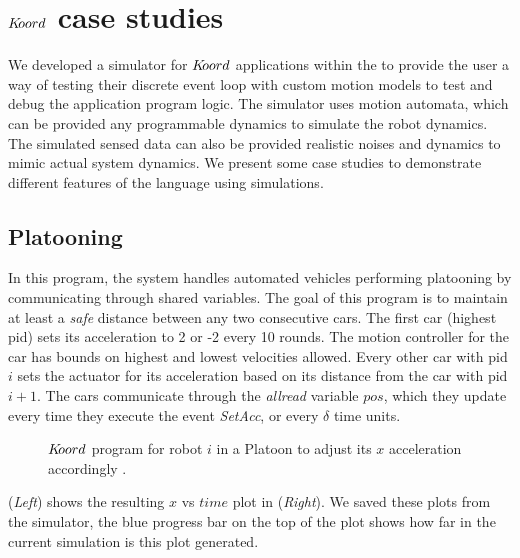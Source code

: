 \section{$K\kern-2pt oord$ case studies}

We developed a simulator for $K\kern-2pt oord$ applications within the to provide the user a way of testing their discrete event loop with custom motion models to test and debug the application program logic. The  simulator uses motion automata, which can be provided any programmable dynamics to simulate the robot dynamics. The simulated sensed data can also be provided realistic noises and dynamics to mimic actual system dynamics. We present some case studies to demonstrate different features of the language using simulations.
\subsection{Platooning}
\label{sec:platooning}
In this program, the system handles automated vehicles performing platooning by communicating through shared variables. The goal of this program is to maintain at least a \emph{safe} distance between any two consecutive cars. The first car (highest pid) sets its acceleration to 2 or -2 every 10 rounds. The motion controller for the car has bounds on highest and lowest velocities allowed. Every other car with pid $i$ sets the actuator for its acceleration based on its distance from the car with pid $i+1$. The cars communicate through the \emph{allread} variable $\mathit{pos}$, which they update every time they execute the event \emph{SetAcc}, or every $\delta$ time units.

\begin{figure}[ht!]
    \noindent
    \begin{center}
        \scriptsize
        {}
        {}
    \end{center}
    \caption{$K\kern-2pt oord$ program for robot $i$ in a Platoon to adjust its $x$ acceleration accordingly .}
    \label{fig:platooningapp}
\end{figure}


 (\emph{Left}) shows the resulting $x$ vs $\mathit{time}$ plot in  (\emph{Right}). We saved these plots from the simulator, the blue progress bar on the top of the plot shows how far in the current simulation is this plot generated. 

